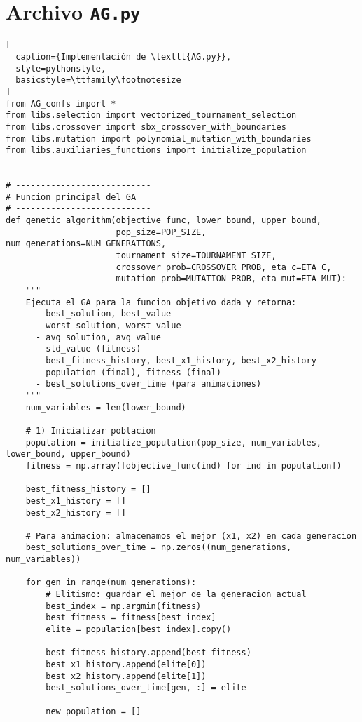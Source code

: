 \section{Archivo \texttt{AG.py}}
\begin{lstlisting}[
  caption={Implementación de \texttt{AG.py}},
  style=pythonstyle,
  basicstyle=\ttfamily\footnotesize
]
from AG_confs import *
from libs.selection import vectorized_tournament_selection
from libs.crossover import sbx_crossover_with_boundaries
from libs.mutation import polynomial_mutation_with_boundaries
from libs.auxiliaries_functions import initialize_population


# ---------------------------
# Funcion principal del GA
# ---------------------------
def genetic_algorithm(objective_func, lower_bound, upper_bound,
                      pop_size=POP_SIZE, num_generations=NUM_GENERATIONS,
                      tournament_size=TOURNAMENT_SIZE,
                      crossover_prob=CROSSOVER_PROB, eta_c=ETA_C,
                      mutation_prob=MUTATION_PROB, eta_mut=ETA_MUT):
    """
    Ejecuta el GA para la funcion objetivo dada y retorna:
      - best_solution, best_value
      - worst_solution, worst_value
      - avg_solution, avg_value
      - std_value (fitness)
      - best_fitness_history, best_x1_history, best_x2_history
      - population (final), fitness (final)
      - best_solutions_over_time (para animaciones)
    """
    num_variables = len(lower_bound)
    
    # 1) Inicializar poblacion
    population = initialize_population(pop_size, num_variables, lower_bound, upper_bound)
    fitness = np.array([objective_func(ind) for ind in population])
    
    best_fitness_history = []
    best_x1_history = []
    best_x2_history = []
    
    # Para animacion: almacenamos el mejor (x1, x2) en cada generacion
    best_solutions_over_time = np.zeros((num_generations, num_variables))
    
    for gen in range(num_generations):
        # Elitismo: guardar el mejor de la generacion actual
        best_index = np.argmin(fitness)
        best_fitness = fitness[best_index]
        elite = population[best_index].copy()
        
        best_fitness_history.append(best_fitness)
        best_x1_history.append(elite[0])
        best_x2_history.append(elite[1])
        best_solutions_over_time[gen, :] = elite
        
        new_population = []
        

\end{lstlisting}
